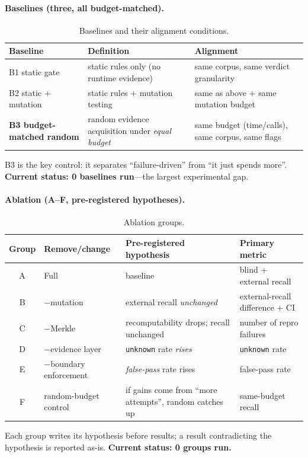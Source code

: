 \documentclass{article}
\begin{document}
\paragraph{Baselines (three, all budget-matched).}
\label{sec:baseline}
\begin{table}[t]
\caption{Baselines and their alignment conditions.}
\label{tab:baseline}
\centering
\small
\begin{tabular}{@{}lp{5.2cm}p{6.4cm}@{}}
\toprule
Baseline & Definition & Alignment \\
\midrule
B1 static gate & static rules only (no runtime evidence) & same corpus, same verdict granularity \\
B2 static $+$ mutation & static rules $+$ mutation testing & same as above $+$ same mutation budget \\
\textbf{B3 budget-matched random} & random evidence acquisition under \emph{equal budget} & same budget (time/calls), same corpus, same flags \\
\bottomrule
\end{tabular}
\end{table}
B3 is the key control: it separates ``failure-driven'' from ``it just spends more''.
\textbf{Current status: 0 baselines run}---the largest experimental gap.

\paragraph{Ablation (A--F, pre-registered hypotheses).}
\begin{table}[t]
\caption{Ablation groups.}
\label{tab:ablation}
\centering
\small
\begin{tabular}{@{}clp{5.6cm}p{3.4cm}@{}}
\toprule
Group & Remove/change & Pre-registered hypothesis & Primary metric \\
\midrule
A & Full & baseline & blind + external recall \\
B & $-$mutation & external recall \emph{unchanged} & external-recall difference $+$ CI \\
C & $-$Merkle & recomputability drops; recall unchanged & number of repro failures \\
D & $-$evidence layer & \texttt{unknown} rate \emph{rises} & \texttt{unknown} rate \\
E & $-$boundary enforcement & \emph{false-pass} rate rises & false-pass rate \\
F & random-budget control & if gains come from ``more attempts'', random catches up & same-budget recall \\
\bottomrule
\end{tabular}
\end{table}
Each group writes its hypothesis before results; a result contradicting the hypothesis is reported
as-is. \textbf{Current status: 0 groups run.}
\end{document}
